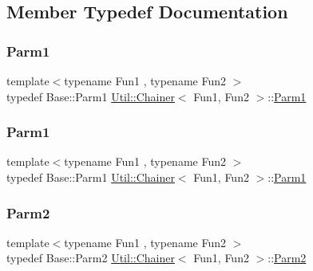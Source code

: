 \subsection{Member Typedef Documentation}
\mbox{\label{classUtil_1_1Chainer_a3e09b2267dabdd8d12070b09c47749c6}} 
\subsubsection{\texorpdfstring{Parm1}{Parm1}\hspace{0.1cm}{\footnotesize\ttfamily [1/2]}}
{\footnotesize\ttfamily template$<$typename Fun1 , typename Fun2 $>$ \\
typedef Base\+::\+Parm1 \mbox{\hyperlink{classUtil_1_1Chainer}{Util\+::\+Chainer}}$<$ Fun1, Fun2 $>$\+::\mbox{\hyperlink{classUtil_1_1Chainer_a3e09b2267dabdd8d12070b09c47749c6}{Parm1}}}

\mbox{\label{classUtil_1_1Chainer_a3e09b2267dabdd8d12070b09c47749c6}} 
\subsubsection{\texorpdfstring{Parm1}{Parm1}\hspace{0.1cm}{\footnotesize\ttfamily [2/2]}}
{\footnotesize\ttfamily template$<$typename Fun1 , typename Fun2 $>$ \\
typedef Base\+::\+Parm1 \mbox{\hyperlink{classUtil_1_1Chainer}{Util\+::\+Chainer}}$<$ Fun1, Fun2 $>$\+::\mbox{\hyperlink{classUtil_1_1Chainer_a3e09b2267dabdd8d12070b09c47749c6}{Parm1}}}

\mbox{\label{classUtil_1_1Chainer_a1bfb0e8f35679278c85d232a74a107ff}} 
\subsubsection{\texorpdfstring{Parm2}{Parm2}\hspace{0.1cm}{\footnotesize\ttfamily [1/2]}}
{\footnotesize\ttfamily template$<$typename Fun1 , typename Fun2 $>$ \\
typedef Base\+::\+Parm2 \mbox{\hyperlink{classUtil_1_1Chainer}{Util\+::\+Chainer}}$<$ Fun1, Fun2 $>$\+::\mbox{\hyperlink{classUtil_1_1Chainer_a1bfb0e8f35679278c85d232a74a107ff}{Parm2}}}

